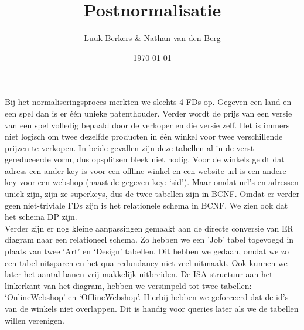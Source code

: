 \documentclass[a4paper, dutch, parskip=full]{scrartcl}
\begin{document}
\title{Postnormalisatie}
\author{Luuk Berkers & Nathan van den Berg}
\date{\today}
\maketitle
Bij het normaliseringsproces merkten we slechts 4 FDs op.
Gegeven een land en een spel dan is er \'{e}\'{e}n unieke patenthouder.
Verder wordt de prijs van een versie van een spel volledig bepaald door de verkoper en die versie zelf.
Het is immers niet logisch om twee dezelfde producten in \'{e}\'{e}n winkel voor twee verschillende prijzen te verkopen.
In beide gevallen zijn deze tabellen al in de verst gereduceerde vorm, dus opsplitsen bleek niet nodig.
Voor de winkels geldt dat adress een ander key is voor een offline winkel en een website url is een andere key voor een webshop (naast de gegeven key: `sid').
Maar omdat url's en adressen uniek zijn, zijn ze superkeys, dus de twee tabellen zijn in BCNF.
Omdat er verder geen niet-triviale FDs zijn is het relationele schema in BCNF.
We zien ook dat het schema DP zijn. \\

Verder zijn er nog kleine aanpassingen gemaakt aan de directe conversie van ER diagram naar een relationeel schema.
Zo hebben we een 'Job' tabel togevoegd in plaats van twee `Art' en `Design' tabellen.
Dit hebben we gedaan, omdat we zo een tabel uitsparen en het qua redundancy niet veel uitmaakt.
Ook kunnen we later het aantal banen vrij makkelijk uitbreiden.
De ISA structuur aan het linkerkant van het diagram, hebben we versimpeld tot twee tabellen: `OnlineWebshop' en `OfflineWebshop'.
Hierbij hebben we geforceerd dat de id's van de winkels niet overlappen.
Dit is handig voor queries later als we de tabellen willen verenigen.
\end{document}
